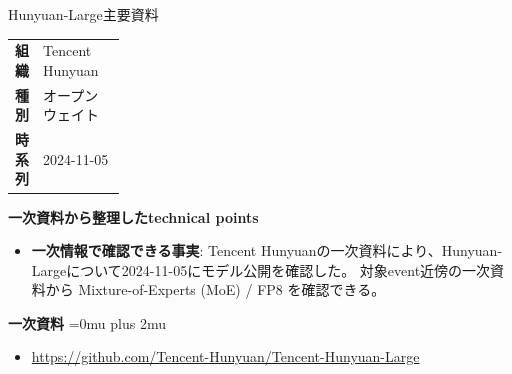 \begin{technicalnote}{Hunyuan-Large}{主要資料}
\begingroup
\begin{tabularx}{\linewidth}{@{}>{\bfseries}p{0.22\linewidth}X@{}}
組織 & Tencent Hunyuan \\
種別 & オープンウェイト \\
時系列 & 2024-11-05 \\
\end{tabularx}
\smallskip
{\bfseries 一次資料から整理したtechnical points}
\begin{itemize}[leftmargin=1.5em,itemsep=0.35em]
\item \textbf{一次情報で確認できる事実}: Tencent Hunyuanの一次資料により、Hunyuan-Largeについて2024-11-05にモデル公開を確認した。 対象event近傍の一次資料から Mixture-of-Experts (MoE) / FP8 を確認できる。
\end{itemize}
\begin{minipage}{\linewidth}
\begin{samepage}
{\bfseries 一次資料}
\begingroup\sloppy
\Urlmuskip=0mu plus 2mu\relax
\begin{itemize}[leftmargin=1.5em,itemsep=0.25em]
\item {\scriptsize\url{https://github.com/Tencent-Hunyuan/Tencent-Hunyuan-Large}}
\end{itemize}
\endgroup
\end{samepage}
\end{minipage}
\endgroup
\end{technicalnote}
\medskip

